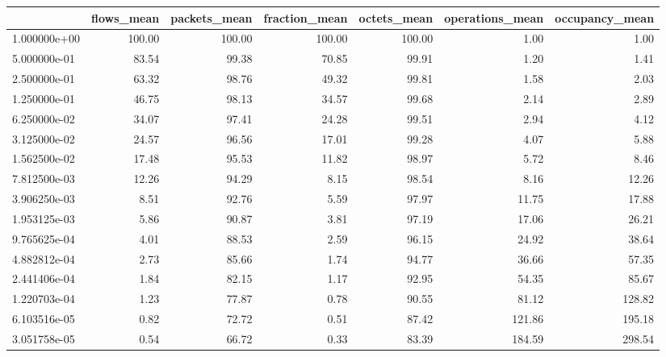\begin{tabular}{lrrrrrr}
\toprule
{} &  flows\_mean &  packets\_mean &  fraction\_mean &  octets\_mean &  operations\_mean &  occupancy\_mean \\
\midrule
1.000000e+00 &      100.00 &        100.00 &         100.00 &       100.00 &             1.00 &            1.00 \\
5.000000e-01 &       83.54 &         99.38 &          70.85 &        99.91 &             1.20 &            1.41 \\
2.500000e-01 &       63.32 &         98.76 &          49.32 &        99.81 &             1.58 &            2.03 \\
1.250000e-01 &       46.75 &         98.13 &          34.57 &        99.68 &             2.14 &            2.89 \\
6.250000e-02 &       34.07 &         97.41 &          24.28 &        99.51 &             2.94 &            4.12 \\
3.125000e-02 &       24.57 &         96.56 &          17.01 &        99.28 &             4.07 &            5.88 \\
1.562500e-02 &       17.48 &         95.53 &          11.82 &        98.97 &             5.72 &            8.46 \\
7.812500e-03 &       12.26 &         94.29 &           8.15 &        98.54 &             8.16 &           12.26 \\
3.906250e-03 &        8.51 &         92.76 &           5.59 &        97.97 &            11.75 &           17.88 \\
1.953125e-03 &        5.86 &         90.87 &           3.81 &        97.19 &            17.06 &           26.21 \\
9.765625e-04 &        4.01 &         88.53 &           2.59 &        96.15 &            24.92 &           38.64 \\
4.882812e-04 &        2.73 &         85.66 &           1.74 &        94.77 &            36.66 &           57.35 \\
2.441406e-04 &        1.84 &         82.15 &           1.17 &        92.95 &            54.35 &           85.67 \\
1.220703e-04 &        1.23 &         77.87 &           0.78 &        90.55 &            81.12 &          128.82 \\
6.103516e-05 &        0.82 &         72.72 &           0.51 &        87.42 &           121.86 &          195.18 \\
3.051758e-05 &        0.54 &         66.72 &           0.33 &        83.39 &           184.59 &          298.54 \\

\end{tabular}
